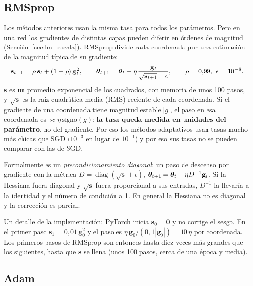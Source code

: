 \subsection{RMSprop \parencite{tieleman2012}}

Los métodos anteriores usan la misma tasa para todos los parámetros. Pero en una red los gradientes de distintas capas
pueden diferir en órdenes de magnitud (Sección~\ref{sec:bn_escala}). RMSprop divide cada coordenada por una estimación de la
magnitud típica de su gradiente:
\begin{equation}
  \mathbf{s}_{t+1} = \rho\,\mathbf{s}_t + (1 - \rho)\,\mathbf{g}_t^2, \qquad
  \boldsymbol{\theta}_{t+1} = \boldsymbol{\theta}_t - \eta\,\frac{\mathbf{g}_t}{\sqrt{\mathbf{s}_{t+1}} + \epsilon},
  \qquad \rho = 0{,}99,\ \epsilon = 10^{-8}.
  \label{eq:rmsprop}
\end{equation}
$\mathbf{s}$ es un promedio exponencial de los cuadrados, con memoria de unos 100 pasos, y $\sqrt{\mathbf{s}}$ es la raíz cuadrática
media (RMS) reciente de cada coordenada. Si el gradiente de una coordenada tiene magnitud estable $|g|$, el paso en esa
coordenada es $\approx\eta\,\mathrm{signo}(g)$: \textbf{la tasa queda medida en unidades del parámetro}, no del gradiente. Por eso
los métodos adaptativos usan tasas mucho más chicas que SGD ($10^{-3}$ en lugar de $10^{-1}$) y por eso sus tasas no se
pueden comparar con las de SGD.

Formalmente es un \emph{precondicionamiento diagonal}: un paso de descenso por gradiente con la métrica
$D = \operatorname{diag}(\sqrt{\mathbf{s}} + \epsilon)$, $\boldsymbol{\theta}_{t+1} = \boldsymbol{\theta}_t - \eta D^{-1}\mathbf{g}_t$. Si la Hessiana fuera diagonal y
$\sqrt{\mathbf{s}}$ fuera proporcional a sus entradas, $D^{-1}$ la llevaría a la identidad y el número de condición a 1. En general
la Hessiana no es diagonal y la corrección es parcial.

Un detalle de la implementación: PyTorch inicia $\mathbf{s}_0 = \mathbf{0}$ y no corrige el sesgo. En el primer paso
$\mathbf{s}_1 = 0{,}01\,\mathbf{g}_0^2$ y el paso es $\eta\,\mathbf{g}_0/(0{,}1|\mathbf{g}_0|) = 10\,\eta$ por coordenada. Los primeros pasos de RMSprop son
entonces hasta diez veces más grandes que los siguientes, hasta que $\mathbf{s}$ se llena (unos 100 pasos, cerca de
una época y media).

\subsection{Adam \parencite{kingma2015}}

